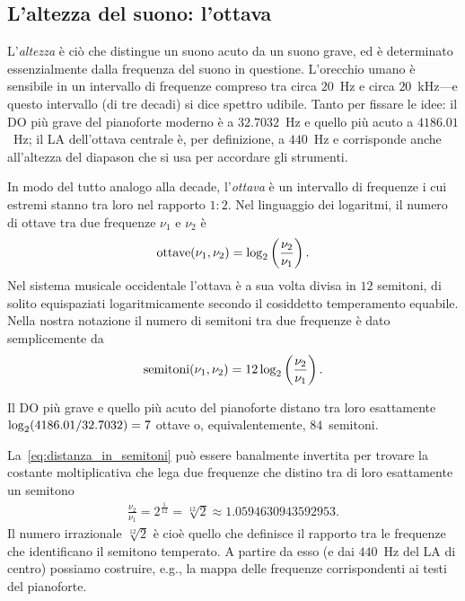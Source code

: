 \subsection{L'altezza del suono: l'ottava}

L'\emph{altezza} è ciò che distingue un suono acuto da un suono grave,
ed è determinato essenzialmente dalla frequenza del suono in questione.
L'orecchio umano è sensibile in un intervallo di frequenze
compreso tra circa $20$~Hz e circa $20$~kHz---e questo intervallo (di tre
decadi) si dice spettro udibile. Tanto per fissare le idee: il DO più grave
del pianoforte moderno è a $32.7032$~Hz e quello più acuto a $4186.01$~Hz;
il LA dell'ottava centrale è, per definizione, a $440$~Hz e corrisponde anche
all'altezza del diapason che si usa per accordare gli strumenti.

In modo del tutto analogo alla decade, l'\emph{ottava} è un intervallo di
frequenze i cui estremi stanno tra loro nel rapporto $1:2$. Nel linguaggio dei
logaritmi, il numero di ottave tra due frequenze $\nu_1$ e $\nu_2$ è
\begin{align}\label{eq:distanza_in_ottave}
  \text{ottave}(\nu_1, \nu_2) = \llog[2]\left( \frac{\nu_2}{\nu_1} \right).
\end{align}
Nel sistema musicale occidentale l'ottava è a sua volta divisa in $12$
semitoni, di solito equispaziati logaritmicamente secondo il cosiddetto
temperamento equabile. Nella nostra notazione il numero di semitoni tra due
frequenze è dato semplicemente da
\begin{align}\label{eq:distanza_in_semitoni}
  \text{semitoni}(\nu_1, \nu_2) = 12\llog[2]\left( \frac{\nu_2}{\nu_1} \right).
\end{align}

\begin{examplebox}
  \begin{example}
    Il DO più grave e quello più acuto del pianoforte distano tra loro
    esattamente $\llog[2](4186.01/32.7032) = 7$ ottave o, equivalentemente,
    $84$~semitoni.
  \end{example}
\end{examplebox}

La~\eqref{eq:distanza_in_semitoni} può essere banalmente invertita per
trovare la costante moltiplicativa che lega due frequenze che distino tra di
loro esattamente un semitono
\begin{align}
  \frac{\nu_2}{\nu_1} = 2^{\frac{1}{12}} =\sqrt[12]{2} \approx 1.0594630943592953.
\end{align}
Il numero irrazionale $\sqrt[12]{2}$ è cioè quello che definisce il rapporto
tra le frequenze che identificano il semitono temperato. A partire da esso
(e dai $440$~Hz del LA di centro) possiamo costruire, e.g., la mappa delle
frequenze corrispondenti ai testi del pianoforte.

